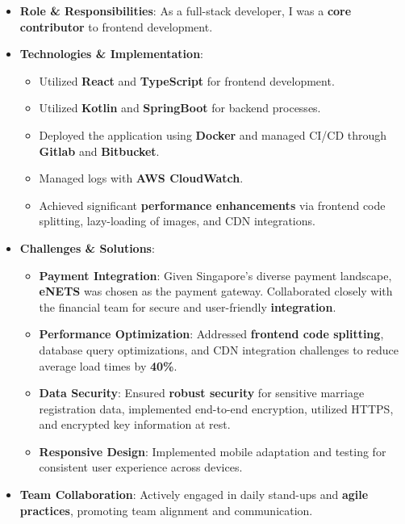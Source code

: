 \documentclass{resume}
\begin{document}
  \begin{itemize}
    \item \textbf{Role \& Responsibilities}: As a full-stack developer, I was a \textbf{core contributor} to frontend development.
    
    \item \textbf{Technologies \& Implementation}:
      \begin{itemize}
        \item Utilized \textbf{React} and \textbf{TypeScript} for frontend development.
        \item Utilized \textbf{Kotlin} and \textbf{SpringBoot} for backend processes.
        \item Deployed the application using \textbf{Docker} and managed CI/CD through \textbf{Gitlab} and \textbf{Bitbucket}.
        \item Managed logs with \textbf{AWS CloudWatch}.
        \item Achieved significant \textbf{performance enhancements} via frontend code splitting, lazy-loading of images, and CDN integrations.
      \end{itemize}
    
    \item \textbf{Challenges \& Solutions}:
      \begin{itemize}
        \item \textbf{Payment Integration}: Given Singapore's diverse payment landscape, \textbf{eNETS} was chosen as the payment gateway. Collaborated closely with the financial team for secure and user-friendly \textbf{integration}.
        \item \textbf{Performance Optimization}: Addressed \textbf{frontend code splitting}, database query optimizations, and CDN integration challenges to reduce average load times by \textbf{40\%}.
        \item \textbf{Data Security}: Ensured \textbf{robust security} for sensitive marriage registration data, implemented end-to-end encryption, utilized HTTPS, and encrypted key information at rest.
        \item \textbf{Responsive Design}: Implemented mobile adaptation and testing for consistent user experience across devices.
      \end{itemize}

    \item \textbf{Team Collaboration}: Actively engaged in daily stand-ups and \textbf{agile practices}, promoting team alignment and communication.
  \end{itemize}
  
\end{document}
